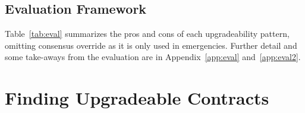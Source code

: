 %




\subsection{Evaluation Framework}


Table~\ref{tab:eval} summarizes the pros and cons of each upgradeability pattern, omitting consensus override as it is only used in emergencies. Further detail and some take-aways from the evaluation are in Appendix~\ref{app:eval} and~\ref{app:eval2}. %






 \section{Finding Upgradeable Contracts} 
 \label{sec:proxyFinding}
 
